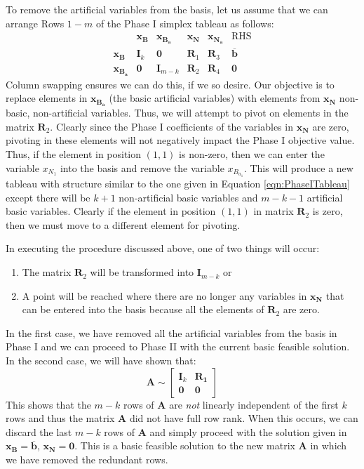To remove the artificial variables from the basis, let us assume that we can arrange Rows $1 - m$ of the Phase I simplex tableau as follows:
\begin{equation}
\begin{array}{l|ccccc}
& \mathbf{x}_\mathbf{B} & \mathbf{x_{B_a}} & \mathbf{x_N} & \mathbf{x_{N_a}} & \text{RHS}\\
\hline
\mathbf{x_B} & \mathbf{I}_k & \mathbf{0} & \mathbf{R}_1 & \mathbf{R}_3 & \overline{\mathbf{b}}\\
\mathbf{x_{B_a}} & \mathbf{0} & \mathbf{I}_{m-k} & \mathbf{R}_2 & \mathbf{R}_4 & \mathbf{0}
\end{array}
\label{eqn:PhaseITableau}
\end{equation}
Column swapping ensures we can do this, if we so desire. Our objective is to replace elements in $\mathbf{x_{B_a}}$ (the basic artificial variables) with elements from $\mathbf{x_N}$ non-basic, non-artificial variables. Thus, we will attempt to pivot on elements in the matrix $\mathbf{R}_2$. Clearly since the Phase I coefficients of the variables in $\mathbf{x_N}$ are zero, pivoting in these elements will not negatively impact the Phase I objective value. Thus, if the element in position $(1,1)$ is non-zero, then we can enter the variable $x_{N_1}$ into the basis and remove the variable $x_{B_{a_1}}$. This will produce a new tableau with structure similar to the one given in Equation \ref{eqn:PhaseITableau} except there will be $k+1$ non-artificial basic variables and $m-k-1$ artificial basic variables. Clearly if the element in position $(1,1)$ in matrix $\mathbf{R}_2$ is zero, then we must move to a different element for pivoting. 

In executing the procedure discussed above, one of two things will occur: 
\begin{enumerate}
\item The matrix $\mathbf{R}_2$ will be transformed into $\mathbf{I}_{m-k}$ or
\item A point will be reached where there are no longer any variables in $\mathbf{x_N}$ that can be entered into the basis because all the elements of $\mathbf{R}_2$ are zero.
\end{enumerate}

In the first case, we have removed all the artificial variables from the basis in Phase I and we can proceed to Phase II with the current basic feasible solution. In the second case, we will have shown that:
\begin{equation}
\mathbf{A} \sim 
\left[
\begin{array}{cc}
\mathbf{I}_k & \mathbf{R_1}\\
\mathbf{0} & \mathbf{0}
\end{array}\right]
\end{equation}
This shows that the $m-k$ rows of $\mathbf{A}$ are \textit{not} linearly independent of the first $k$ rows and thus the matrix $\mathbf{A}$ did not have full row rank. When this occurs, we can discard the last $m-k$ rows of $\mathbf{A}$ and simply proceed with the solution given in $\mathbf{x}_\mathbf{B} = \overline{\mathbf{b}}$, $\mathbf{x}_\mathbf{N} = \mathbf{0}$. This is a basic feasible solution to the new matrix $\mathbf{A}$ in which we have removed the redundant rows.

